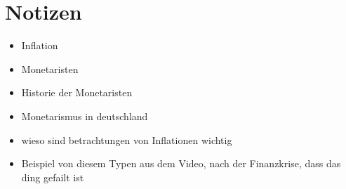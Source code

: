 \documentclass[
	12pt,
	BCOR=5mm,
	DIV=12,
	headinclude=on,
	footinclude=off,
	parskip=half,
	bibliography=totoc,
	listof=entryprefix,
	toc=listof,
	numbers=noenddot,
]{scrreprt}
\begin{document}
\section*{Notizen}

\begin{itemize}
    \item Inflation
    \item Monetaristen
    \item Historie der Monetaristen
    \item Monetarismus in deutschland
    \item wieso sind betrachtungen von Inflationen wichtig
    \item Beispiel von diesem Typen aus dem Video, nach der Finanzkrise, dass das ding gefailt ist
\end{itemize}

\printbibliography[title=Literaturverzeichnis]
\end{document}
